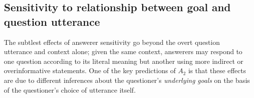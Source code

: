 \documentclass[11pt, floatsintext]{apa6}
\begin{document}
\subsection{Sensitivity to relationship between goal and question utterance}


The subtlest effects of answerer sensitivity go beyond the overt question utterance and context alone; given the same context, answerers may respond to one question according to its literal meaning but another using more indirect or overinformative statements. One of the key predictions of  $A_2$ is that these effects are due to different inferences about the questioner's \emph{underlying goals} on the basis of the questioner's choice of utterance itself. 
\end{document}
